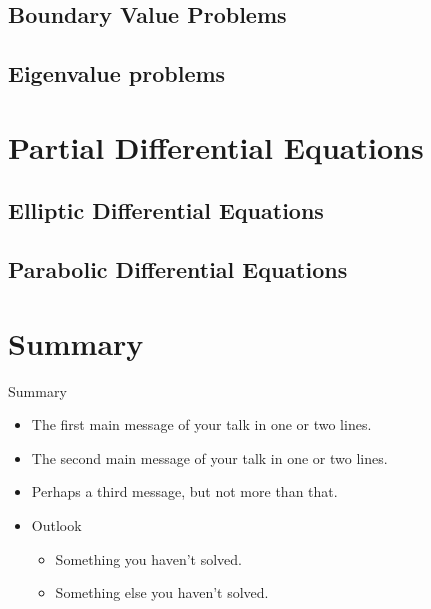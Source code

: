 \documentclass{beamer}
\begin{document}
\subsection{Boundary Value Problems}
\subsection{Eigenvalue problems}

\section{Partial Differential Equations}
\subsection{Elliptic Differential Equations}
\subsection{Parabolic Differential Equations}

\section*{Summary}

\begin{frame}{Summary}
  \begin{itemize}
  \item
    The \alert{first main message} of your talk in one or two lines.
  \item
    The \alert{second main message} of your talk in one or two lines.
  \item
    Perhaps a \alert{third message}, but not more than that.
  \end{itemize}
  
  \begin{itemize}
  \item
    Outlook
    \begin{itemize}
    \item
      Something you haven't solved.
    \item
      Something else you haven't solved.
    \end{itemize}
  \end{itemize}
\end{frame}
\end{document}
